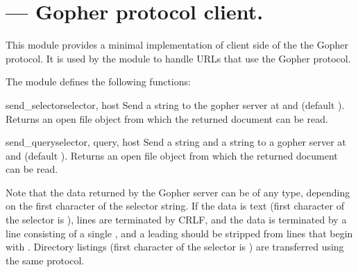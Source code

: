 \section{ ---
         Gopher protocol client.}




This module provides a minimal implementation of client side of the
the Gopher protocol.  It is used by the module  to handle
URLs that use the Gopher protocol.

The module defines the following functions:

\begin{funcdesc}{send_selector}{selector, host}
Send a  string to the gopher server at  and
 (default ).  Returns an open file object from
which the returned document can be read.
\end{funcdesc}

\begin{funcdesc}{send_query}{selector, query, host}
Send a  string and a  string to a gopher
server at  and  (default ).  Returns an
open file object from which the returned document can be read.
\end{funcdesc}

Note that the data returned by the Gopher server can be of any type,
depending on the first character of the selector string.  If the data
is text (first character of the selector is ), lines are
terminated by CRLF, and the data is terminated by a line consisting of
a single , and a leading  should be stripped from
lines that begin with .  Directory listings (first character
of the selector is ) are transferred using the same protocol.

